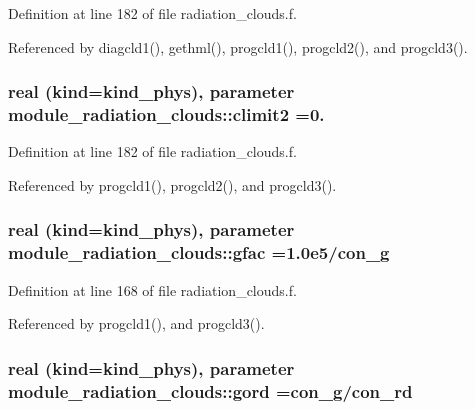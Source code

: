 Definition at line 182 of file radiation\+\_\+clouds.\+f.



Referenced by diagcld1(), gethml(), progcld1(), progcld2(), and progcld3().

\subsubsection[{\texorpdfstring{climit2}{climit2}}]{\setlength{\rightskip}{0pt plus 5cm}real (kind=kind\+\_\+phys), parameter module\+\_\+radiation\+\_\+clouds\+::climit2 =0.\hspace{0.3cm}{\ttfamily [private]}}\hypertarget{group__module__radiation__clouds_ga2f6f333d39f496f623036802fc05f209}{}\label{group__module__radiation__clouds_ga2f6f333d39f496f623036802fc05f209}


Definition at line 182 of file radiation\+\_\+clouds.\+f.



Referenced by progcld1(), progcld2(), and progcld3().

\subsubsection[{\texorpdfstring{gfac}{gfac}}]{\setlength{\rightskip}{0pt plus 5cm}real (kind=kind\+\_\+phys), parameter module\+\_\+radiation\+\_\+clouds\+::gfac =1.\+0e5/con\+\_\+g\hspace{0.3cm}{\ttfamily [private]}}\hypertarget{group__module__radiation__clouds_gab4060544be25be2b0a87042fb3bd6242}{}\label{group__module__radiation__clouds_gab4060544be25be2b0a87042fb3bd6242}


Definition at line 168 of file radiation\+\_\+clouds.\+f.



Referenced by progcld1(), and progcld3().

\subsubsection[{\texorpdfstring{gord}{gord}}]{\setlength{\rightskip}{0pt plus 5cm}real (kind=kind\+\_\+phys), parameter module\+\_\+radiation\+\_\+clouds\+::gord =con\+\_\+g/con\+\_\+rd\hspace{0.3cm}{\ttfamily [private]}}\hypertarget{group__module__radiation__clouds_ga50ea21222eb91e6363e8bf1338b34a66}{}\label{group__module__radiation__clouds_ga50ea21222eb91e6363e8bf1338b34a66}


